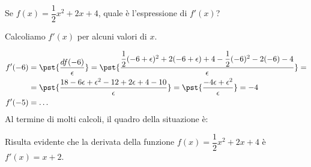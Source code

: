 \begin{esempio}
\label{esempio:esempio_5}
Se \(f(x)=\dfrac{1}{2}x^2+2x+4\), quale è l'espressione di \(f'(x)\)?

Calcoliamo \(f'(x)\) per alcuni valori di \(x\).

\begin{align*}
f'(-6) &= \pst{\dfrac{df(-6)}{\epsilon}}=
   \pst{\dfrac{\dfrac{1}{2}(-6+\epsilon)^2+2(-6 +\epsilon)+4 - 
              \dfrac{1}{2}(-6)^2-2(-6)-4}
              {\epsilon}} = \\
&= \pst{\dfrac{18 - 6\epsilon +\epsilon^2 -12 +2\epsilon +4 - 10}
              {\epsilon}} = 
   \pst{\dfrac{-4\epsilon +\epsilon^2}{\epsilon}} = -4 \\
f'(-5) &= \dots
\end{align*}
Al termine di molti calcoli, il quadro della situazione è:

Risulta evidente che la derivata della funzione 
\(f(x)=\dfrac{1}{2}x^2+2x+4\) \quad è \quad 
\(f'(x) = x +2\).


\end{esempio}
